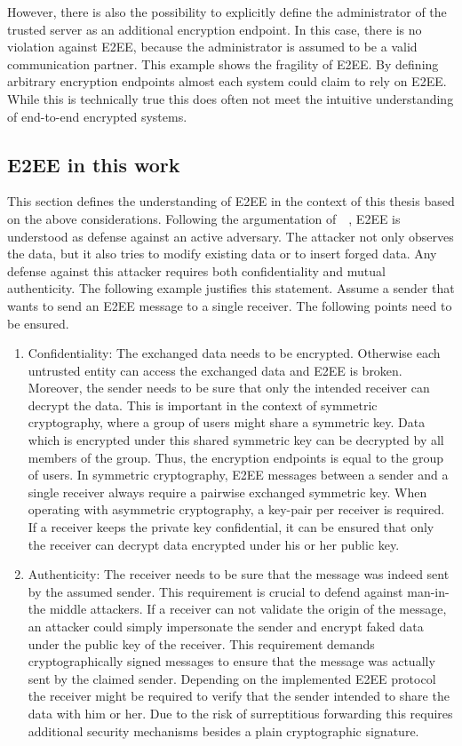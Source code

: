 \documentclass[../main.tex]{subfiles}
\begin{document}
However, there is also the possibility to explicitly define the administrator of the trusted server as an additional encryption endpoint.
In this case, there is no violation against E2EE, because the administrator is assumed to be a valid communication partner.
This example shows the fragility of E2EE.
By defining arbitrary encryption endpoints almost each system could claim to rely on E2EE.
While this is technically true this does often not meet the intuitive understanding of end-to-end encrypted systems.

\subsection{E2EE in this work}
This section defines the understanding of E2EE in the context of this thesis based on the above considerations.
Following the argumentation of~\citeauthor{Hale2022}~\cite{Hale2022}, E2EE is understood as defense against an active adversary.
The attacker not only observes the data, but it also tries to modify existing data or to insert forged data.
Any defense against this attacker requires both confidentiality and mutual authenticity.
The following example justifies this statement.
Assume a sender that wants to send an E2EE message to a single receiver.
The following points need to be ensured.
\begin{enumerate}
    \item Confidentiality: 
    The exchanged data needs to be encrypted. Otherwise each untrusted entity can access the exchanged data and E2EE is broken.
    Moreover, the sender needs to be sure that only the intended receiver can decrypt the data. 
    This is important in the context of symmetric cryptography, where a group of users might share a symmetric key.
    Data which is encrypted under this shared symmetric key can be decrypted by all members of the group.
    Thus, the encryption endpoints is equal to the group of users.
    In symmetric cryptography, E2EE messages between a sender and a single receiver always require a pairwise exchanged symmetric key.
    When operating with asymmetric cryptography, a key-pair per receiver is required.
    If a receiver keeps the private key confidential, it can be ensured that only the receiver can decrypt data encrypted under his or her public key.
    \item Authenticity: 
    The receiver needs to be sure that the message was indeed sent by the assumed sender. 
    This requirement is crucial to defend against man-in-the middle attackers.
    If a receiver can not validate the origin of the message, an attacker could simply impersonate the sender and encrypt faked data under the public key of the receiver.
    This requirement demands cryptographically signed messages to ensure that the message was actually sent by the claimed sender.
    Depending on the implemented E2EE protocol the receiver might be required to verify that the sender intended to share the data with him or her.
    Due to the risk of surreptitious forwarding this requires additional security mechanisms besides a plain cryptographic signature.
\end{enumerate}
\end{document}
